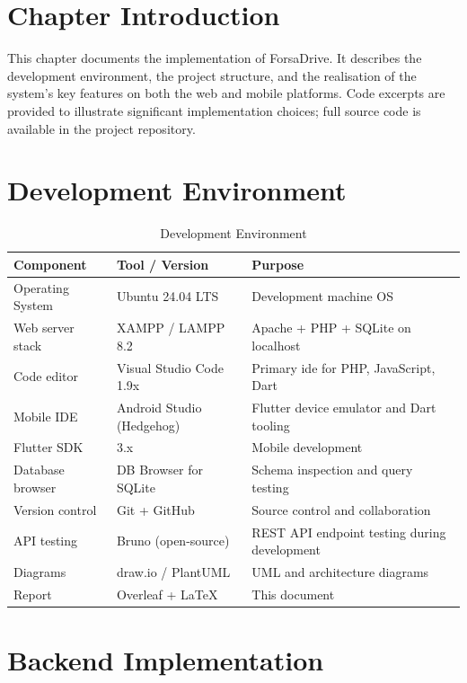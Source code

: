 \documentclass[12pt,a4paper,openright]{report}
\begin{document}
\section*{Chapter Introduction}
This chapter documents the implementation of ForsaDrive. It describes the development environment, the project structure, and the realisation of the system's key features on both the web and mobile platforms. Code excerpts are provided to illustrate significant implementation choices; full source code is available in the project repository.

\section{Development Environment}

\begin{table}[H]
\centering
\caption{Development Environment}
\label{tab:dev-env}
\begin{tabularx}{\textwidth}{l l X}
\toprule
\textbf{Component} & \textbf{Tool / Version} & \textbf{Purpose} \\
\midrule
Operating System & Ubuntu 24.04 LTS & Development machine OS \\
Web server stack & XAMPP / LAMPP 8.2 & Apache + PHP + SQLite on localhost \\
Code editor & Visual Studio Code 1.9x & Primary \gls{ide} for PHP, JavaScript, Dart \\
Mobile IDE & Android Studio (Hedgehog) & Flutter device emulator and Dart tooling \\
Flutter SDK & 3.x & Mobile development \\
Database browser & DB Browser for SQLite & Schema inspection and query testing \\
Version control & Git + GitHub & Source control and collaboration \\
API testing & Bruno (open-source) & REST API endpoint testing during development \\
Diagrams & draw.io / PlantUML & UML and architecture diagrams \\
Report & Overleaf + \LaTeX & This document \\
\bottomrule
\end{tabularx}
\end{table}

\section{Backend Implementation}
\end{document}
